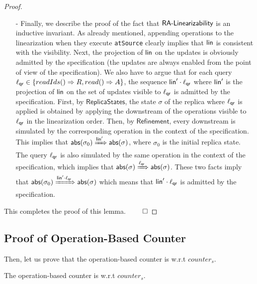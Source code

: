 \begin {proof}
\begin{itemize}
\item[-] Finally, we describe the proof of the fact that $\mathsf{\CRDTLinshort{}}$ is an inductive invariant. As already mentioned, appending operations to the linearization when they execute {\tt atSource} clearly implies that $\alinord$ is consistent with the visibility. Next, the projection of $\alinord$ on the updates is obviously admitted by the specification (the updates are always enabled from the point of view of the specification).
We also have to argue that for each query $\alabel_{\mathsf{qr}}\in\{\alabellongind[readIds]{}{R}{},\alabellongind[read]{}{A}{}\}$, the sequence $\alinord'\cdot \alabel_{\mathsf{qr}}$ where $\alinord'$ is the projection of $\alinord$ on the set of updates
visible to $\alabel_{\mathsf{qr}}$ is admitted by the specification. First, by $\mathsf{ReplicaStates}$, the state $\sigma$ of the replica where $\alabel_{\mathsf{qr}}$ is applied is obtained by applying the downstream of the operations visible to $\alabel_{\mathsf{qr}}$ in the linearization order. Then, by $\mathsf{Refinement}$, every downstream is simulated by the corresponding operation in the context of the specification. This implies that $\refmap(\sigma_0)\xRightarrow{\alinord'}\refmap(\sigma)$, where $\sigma_0$ is the initial replica state. The query $\alabel_{\mathsf{qr}}$ is also simulated by the same operation in the context of the specification, which implies that $\refmap(\sigma)\xRightarrow{\alabel_{\mathsf{qr}}}\refmap(\sigma)$. These two facts imply that $\refmap(\sigma_0)\xRightarrow{\alinord'\cdot \alabel_{\mathsf{qr}}}\refmap(\sigma)$ which means that $\alinord'\cdot \alabel_{\mathsf{qr}}$ is admitted by the specification.
\end{itemize}

This completes the proof of this lemma. $\qed$
\end {proof}




\subsection{Proof of Operation-Based Counter}
\label{subsec:proof of operation-based counter}

Then, let us prove that the operation-based counter is \crdtlinearizable{} w.r.t $\mathit{counter}_s$.

\begin{lemma}
\label{lemma:operation-based counter is correct}
The operation-based counter is \crdtlinearizable{} w.r.t $\mathit{counter}_s$.
\end{lemma}

